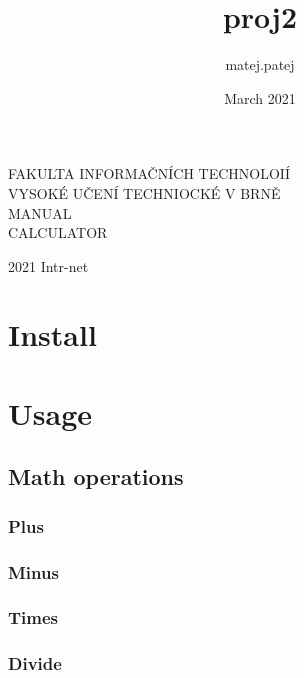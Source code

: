 \documentclass[11pt, a4paper]{article}
\title{proj2}
\author{matej.patej }
\date{March 2021}
\begin{document}
    \begin{titlepage}
        \begin{center}
            \vspace*{1cm}

            \huge
            \Huge F\huge AKULTA INFORMAČNÍCH TECHNOLOIÍ\\
            \hspace{0.2cm}
            \Huge V\huge YSOKÉ UČENÍ TECHNIOCKÉ V \Huge B\huge RNĚ\\
            MANUAL\\
            CALCULATOR


        \end{center}
        {\LARGE 2021 \hfill
        Intr-net}
    \end{titlepage}

    \newpage


    \section{Install}


    \section{Usage}

    \subsection{Math operations}

    \subsubsection{Plus}

    \subsubsection{Minus}

    \subsubsection{Times}

    \subsubsection{Divide}
\end{document}

